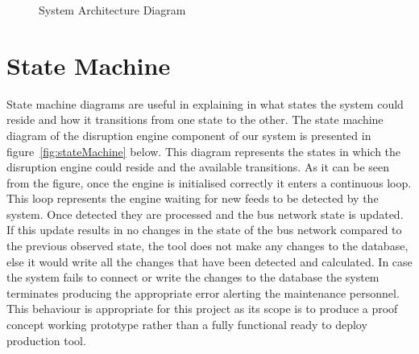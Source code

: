 \begin{figure}
	\caption{System Architecture Diagram}
\label{fig:systemArchitecture}
\end{figure}

\FloatBarrier
\section{State Machine}
State machine diagrams are useful in explaining in what states the system could reside and how it transitions from one state to the other. The state machine diagram of the disruption engine component of our system is presented in figure~\ref{fig:stateMachine} below. This diagram represents the states in which the disruption engine could reside and the available transitions. As it can be seen from the figure, once the engine is initialised correctly it enters a continuous loop. This loop represents the engine waiting for new feeds to be detected by the system. Once detected they are processed and the bus network state is updated. If this update results in no changes in the state of the bus network compared to the previous observed state, the tool does not make any changes to the database, else it would write all the changes that have been detected and calculated. In case the system fails to connect or write the changes to the database the system terminates producing the appropriate error alerting the maintenance personnel. This behaviour is appropriate for this project as its scope is to produce a proof concept working prototype rather than a fully functional ready to deploy production tool.

